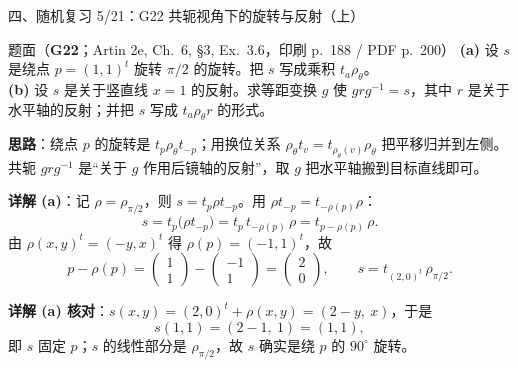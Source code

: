 \documentclass[aspectratio=169,10pt,fontset=none]{ctexbeamer}
\newcommand{\ex}[1]{\textcolor{accent}{\footnotesize\bfseries #1}}
\newcommand{\key}[1]{\textcolor{ink}{\bfseries #1}}
\begin{document}
\begin{frame}[t]{四、随机复习 5/21：G22 共轭视角下的旋转与反射（上）}
\label{ex:G22}
\scriptsize
\begin{block}{\footnotesize 题面（\ex{G22}；Artin 2e, Ch.~6, §3, Ex.~3.6，印刷 p.~188 / PDF p.~200）}
\textbf{(a)} 设 $s$ 是绕点 $p=(1,1)^t$ 旋转 $\pi/2$ 的旋转。把 $s$ 写成乘积 $t_a\rho_\theta$。\\
\textbf{(b)} 设 $s$ 是关于竖直线 $x=1$ 的反射。求等距变换 $g$ 使 $grg^{-1}=s$，其中 $r$ 是关于水平轴的反射；并把 $s$ 写成 $t_a\rho_\theta r$ 的形式。
\end{block}
\key{思路}：绕点 $p$ 的旋转是 $t_p\rho_\theta t_{-p}$；用换位关系 $\rho_\theta t_v=t_{\rho_\theta(v)}\rho_\theta$ 把平移归并到左侧。共轭 $grg^{-1}$ 是“关于 $g$ 作用后镜轴的反射”，取 $g$ 把水平轴搬到目标直线即可。

\key{详解 (a)}：记 $\rho=\rho_{\pi/2}$，则 $s=t_p\rho t_{-p}$。用 $\rho t_{-p}=t_{-\rho(p)}\rho$：
\[ s=t_p\bigl(\rho t_{-p}\bigr)=t_p\,t_{-\rho(p)}\,\rho=t_{p-\rho(p)}\,\rho. \]
由 $\rho(x,y)^t=(-y,x)^t$ 得 $\rho(p)=(-1,1)^t$，故
\[ p-\rho(p)=\begin{pmatrix}1\\1\end{pmatrix}-\begin{pmatrix}-1\\1\end{pmatrix}=\begin{pmatrix}2\\0\end{pmatrix},\qquad s=t_{(2,0)^t}\,\rho_{\pi/2}. \]

\key{详解 (a) 核对}：$s(x,y)=(2,0)^t+\rho(x,y)=(2-y,\ x)$，于是
\[ s(1,1)=(2-1,\ 1)=(1,1), \]
即 $s$ 固定 $p$；$s$ 的线性部分是 $\rho_{\pi/2}$，故 $s$ 确实是绕 $p$ 的 $90^\circ$ 旋转。
\end{frame}
\end{document}
